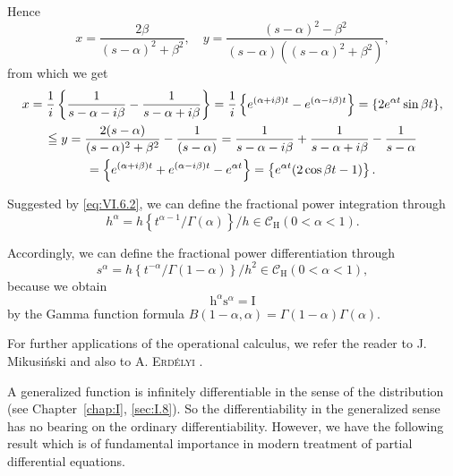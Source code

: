 Hence 
\[
x = \frac {2 \beta}{(s - \alpha) ^{2} + \beta^{2}}, \quad y = \frac {(s - \alpha) ^{2} - \beta^{2}}{(s - \alpha) ((s - \alpha) ^{2} + \beta^{2})},
\]
from which we get 
\begin{gather}x = \frac {1}{i} \left\{\frac {1}{s - \alpha - i \beta} - \frac {1}{s - \alpha + i \beta} \right\} = \frac {1}{i} \left\{e ^{(\alpha + i \beta) t} - e ^{(\alpha - i \beta) t} \right\} = {} \{2 e ^{\alpha t} \sin \beta t \}, \notag
\\\leqq {} y = \frac {2 (s - \alpha)}{(s - \alpha) ^{2} + \beta^{2}} - \frac {1}{(s - \alpha)} = \frac {1}{s - \alpha - i \beta} + \frac {1}{s - \alpha + i \beta} - \frac {1}{s - \alpha} \notag
\\= \left\{e ^{(\alpha + i \beta) t} + e ^{(\alpha - i \beta) t} - e ^{\alpha t} \right\} = \left\{e ^{\alpha t} (2 \cos \beta t - 1) \right\}. \notag
\end{gather}

\begin{remarku} Suggested by \eqref{eq:VI.6.2}, we can define the fractional power integration through 
\begin{equation}\label{eq:VI.6.17}
h ^{\alpha} = h \left\{t ^{\alpha -1} / \Gamma (\alpha) \right\} / h \in \mathcal {C} _ {\mathrm{H}} (0 < \alpha < 1).
\end{equation}
\end{remarku}

Accordingly, we can define the fractional power differentiation through 
\begin{equation}\label{eq:VI.6.18}
s ^{\alpha} = h \left\{t ^{- \alpha} / \Gamma (1 - \alpha) \right\} / h ^{2} \in \mathcal {C} _ {\mathrm{H}} (0 < \alpha < 1),
\end{equation}
because we obtain 
\begin{equation}\label{eq:VI.6.19}
\mathrm{h} ^{\alpha} \mathrm{s} ^{\alpha} = \mathrm{I}
\end{equation}
by the Gamma function formula $B(1 - \alpha, \alpha) = \Gamma(1 - \alpha) \Gamma(\alpha)$. 

For further applications of the operational calculus, we refer the reader to J. Mikusiński \cite{mikusinski196} and also to A. \textsc{Erdélyi} \cite{erdelyi55}. 


\label{sec:VI.7}

A generalized function is infinitely differentiable in the sense of the distribution (see Chapter~\ref{chap:I}, \ref{sec:I.8}). So the differentiability in the generalized sense has no bearing on the ordinary differentiability. However, we have the following result which is of fundamental importance in modern treatment of partial differential equations. 

